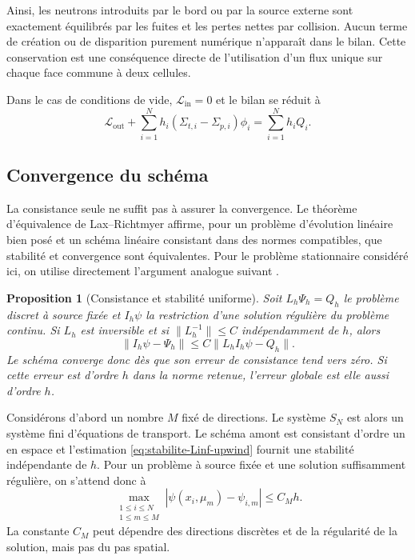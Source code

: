\documentclass{article}
\newtheorem{proposition}[theorem]{Proposition}
\begin{document}
Ainsi, les neutrons introduits par le bord ou par la source externe sont exactement équilibrés par les fuites et les pertes nettes par collision. Aucun terme de création ou de disparition purement numérique n'apparaît dans le bilan. Cette conservation est une conséquence directe de l'utilisation d'un flux unique sur chaque face commune à deux cellules.

Dans le cas de conditions de vide, $\mathcal L_{\mathrm{in}}=0$ et le
bilan se réduit à
\[
    \mathcal L_{\mathrm{out}}
    + \sum_{i=1}^{N} h_i \left(\Sigma_{t,i}-\Sigma_{p,i} \right)\phi_i
    = \sum_{i=1}^{N}h_iQ_i.
\]

\subsection {Convergence du schéma}

La consistance seule ne suffit pas à assurer la convergence. Le théorème d'équivalence de Lax--Richtmyer affirme, pour un problème d'évolution linéaire bien posé et un schéma linéaire consistant dans des normes compatibles, que stabilité et convergence sont équivalentes. Pour le problème stationnaire considéré ici, on utilise directement l'argument analogue suivant \cite[chap.~5, section~5.1]{Allaire2018}.

\begin{proposition}[Consistance et stabilité uniforme]
Soit $L_h\Psi_h=Q_h$ le problème discret à source fixée et $I_h\psi$ la restriction d'une solution régulière du problème continu. Si $L_h$ est inversible et si $\|L_h^{-1}\|\leq C$ indépendamment de $h$, alors
\[
\|I_h\psi-\Psi_h\|\leq C\|L_hI_h\psi-Q_h\|.
\]
Le schéma converge donc dès que son erreur de consistance tend vers zéro. Si cette erreur est d'ordre $h$ dans la norme retenue, l'erreur globale est elle aussi d'ordre $h$.
\end{proposition}

Considérons d'abord un nombre $M$ fixé de directions. Le système $S_N$ est alors un système fini d'équations de transport. Le schéma amont est consistant d'ordre un en espace et l'estimation \eqref{eq:stabilite-Linf-upwind} fournit une stabilité indépendante de $h$. Pour un problème à source fixée et une solution suffisamment régulière, on s'attend donc à
\begin{equation}
    \max_{\substack{1\leq i\leq N\\1\leq m\leq M}}
    \left| \psi(x_i,\mu_m)-\psi_{i,m} \right| \leq C_M h.
    \label{eq:convergence-spatiale-transport}
\end{equation}
La constante $C_M$ peut dépendre des directions discrètes et de la régularité de la solution, mais pas du pas spatial.
\end{document}
